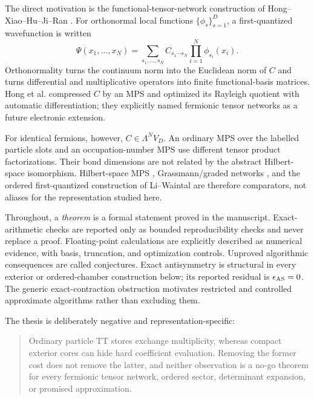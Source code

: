 \documentclass[11pt]{article}
\theoremstyle{definition}
\begin{document}
The direct motivation is the functional-tensor-network construction of
Hong--Xiao--Hu--Ji--Ran \cite{Hong2022FunctionalTN}.  For orthonormal local
functions $\{\phi_s\}_{s=1}^D$, a first-quantized wavefunction is written
\begin{equation}
 \Psi(x_1,\ldots,x_N)=
 \sum_{s_1,\ldots,s_N}C_{s_1\cdots s_N}
 \prod_{i=1}^N\phi_{s_i}(x_i).
 \label{eq:functional-expansion}
\end{equation}
Orthonormality turns the continuum norm into the Euclidean norm of $C$ and
turns differential and multiplicative operators into finite functional-basis
matrices.  Hong et al. compressed $C$ by an MPS and optimized its Rayleigh
quotient with automatic differentiation; they explicitly named fermionic
tensor networks as a future electronic extension.

For identical fermions, however, $C\in\Lambda^N V_D$.  An ordinary MPS over
the labelled particle slots and an occupation-number MPS use different tensor
product factorizations.  Their bond dimensions are not related by the abstract
Hilbert-space isomorphism.  Hilbert-space MPS \cite{LiChan2016HSMPS},
Grassmann/graded networks \cite{KongZhuXie2026GrassmannTN}, and the ordered
first-quantized construction of Li--Waintal
\cite{LiWaintal2026FirstQuantization} are therefore comparators, not aliases
for the representation studied here.

Throughout, a \emph{theorem} is a formal
statement proved in the manuscript.  Exact-arithmetic checks are reported only
as bounded reproducibility checks and never replace a proof.  Floating-point
calculations are explicitly described as numerical evidence, with basis,
truncation, and optimization controls.  Unproved algorithmic consequences are
called conjectures.  Exact antisymmetry is structural in every exterior or
ordered-chamber construction below; its reported residual is
$\epsilon_{\rm AS}=0$.  The generic exact-contraction obstruction motivates
restricted and controlled approximate algorithms rather than excluding them.

The thesis is deliberately negative and representation-specific:
\begin{quote}
Ordinary particle TT stores exchange multiplicity, whereas compact exterior
cores can hide hard coefficient evaluation.  Removing the former cost does
not remove the latter, and neither observation is a no-go theorem for every
fermionic tensor network, ordered sector, determinant expansion, or promised
approximation.
\end{quote}
\end{document}
